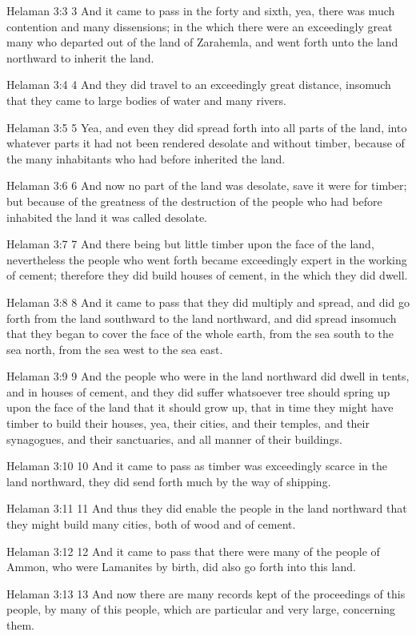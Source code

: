 Helaman 3:3
 3 And it came to pass in the forty and sixth, yea, there was
much contention and many dissensions; in the which there were an
exceedingly great many who departed out of the land of Zarahemla,
and went forth unto the land northward to inherit the land.

Helaman 3:4
 4 And they did travel to an exceedingly great distance, insomuch
that they came to large bodies of water and many rivers.

Helaman 3:5
 5 Yea, and even they did spread forth into all parts of the
land, into whatever parts it had not been rendered desolate and
without timber, because of the many inhabitants who had before
inherited the land.

Helaman 3:6
 6 And now no part of the land was desolate, save it were for
timber; but because of the greatness of the destruction of the
people who had before inhabited the land it was called desolate.

Helaman 3:7
 7 And there being but little timber upon the face of the land,
nevertheless the people who went forth became exceedingly expert
in the working of cement; therefore they did build houses of
cement, in the which they did dwell.

Helaman 3:8
 8 And it came to pass that they did multiply and spread, and did
go forth from the land southward to the land northward, and did
spread insomuch that they began to cover the face of the whole
earth, from the sea south to the sea north, from the sea west to
the sea east.

Helaman 3:9
 9 And the people who were in the land northward did dwell in
tents, and in houses of cement, and they did suffer whatsoever
tree should spring up upon the face of the land that it should
grow up, that in time they might have timber to build their
houses, yea, their cities, and their temples, and their
synagogues, and their sanctuaries, and all manner of their
buildings.

Helaman 3:10
 10 And it came to pass as timber was exceedingly scarce in the
land northward, they did send forth much by the way of shipping.

Helaman 3:11
 11 And thus they did enable the people in the land northward
that they might build many cities, both of wood and of cement.

Helaman 3:12
 12 And it came to pass that there were many of the people of
Ammon, who were Lamanites by birth, did also go forth into this
land.

Helaman 3:13
 13 And now there are many records kept of the proceedings of
this people, by many of this people, which are particular and
very large, concerning them.

